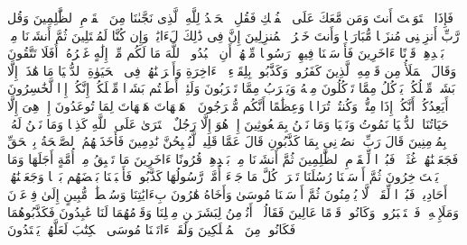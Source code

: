\startbuffer[\q:23:28]
فَإِذَا ٱسۡتَوَیۡتَ أَنتَ وَمَن مَّعَكَ عَلَى ٱلۡفُلۡكِ فَقُلِ ٱلۡحَمۡدُ لِلَّهِ ٱلَّذِی نَجَّىٰنَا مِنَ ٱلۡقَوۡمِ ٱلظَّٰلِمِینَ%
\stopbuffer%
\startbuffer[\q:23:29]
وَقُل رَّبِّ أَنزِلۡنِی مُنزَلࣰا مُّبَارَكࣰا وَأَنتَ خَیۡرُ ٱلۡمُنزِلِینَ%
\stopbuffer%
\startbuffer[\q:23:30]
إِنَّ فِی ذَٰلِكَ لَءَایَٰتࣲ وَإِن كُنَّا لَمُبۡتَلِینَ%
\stopbuffer%
\startbuffer[\q:23:31]
ثُمَّ أَنشَأۡنَا مِنۢ بَعۡدِهِمۡ قَرۡنًا ءَاخَرِینَ%
\stopbuffer%
\startbuffer[\q:23:32]
فَأَرۡسَلۡنَا فِیهِمۡ رَسُولࣰا مِّنۡهُمۡ أَنِ ٱعۡبُدُوا۟ ٱللَّهَ مَا لَكُم مِّنۡ إِلَٰهٍ غَیۡرُهُۥۤۚ أَفَلَا تَتَّقُونَ%
\stopbuffer%
\startbuffer[\q:23:33]
وَقَالَ ٱلۡمَلَأُ مِن قَوۡمِهِ ٱلَّذِینَ كَفَرُوا۟ وَكَذَّبُوا۟ بِلِقَاۤءِ ٱلۡءَاخِرَةِ وَأَتۡرَفۡنَٰهُمۡ فِی ٱلۡحَیَوٰةِ ٱلدُّنۡیَا مَا هَٰذَاۤ إِلَّا بَشَرࣱ مِّثۡلُكُمۡ یَأۡكُلُ مِمَّا تَأۡكُلُونَ مِنۡهُ وَیَشۡرَبُ مِمَّا تَشۡرَبُونَ%
\stopbuffer%
\startbuffer[\q:23:34]
وَلَئِنۡ أَطَعۡتُم بَشَرࣰا مِّثۡلَكُمۡ إِنَّكُمۡ إِذࣰا لَّخَٰسِرُونَ%
\stopbuffer%
\startbuffer[\q:23:35]
أَیَعِدُكُمۡ أَنَّكُمۡ إِذَا مِتُّمۡ وَكُنتُمۡ تُرَابࣰا وَعِظَٰمًا أَنَّكُم مُّخۡرَجُونَ%
\stopbuffer%
\startbuffer[\q:23:36]
۞ هَیۡهَاتَ هَیۡهَاتَ لِمَا تُوعَدُونَ%
\stopbuffer%
\startbuffer[\q:23:37]
إِنۡ هِیَ إِلَّا حَیَاتُنَا ٱلدُّنۡیَا نَمُوتُ وَنَحۡیَا وَمَا نَحۡنُ بِمَبۡعُوثِینَ%
\stopbuffer%
\startbuffer[\q:23:38]
إِنۡ هُوَ إِلَّا رَجُلٌ ٱفۡتَرَىٰ عَلَى ٱللَّهِ كَذِبࣰا وَمَا نَحۡنُ لَهُۥ بِمُؤۡمِنِینَ%
\stopbuffer%
\startbuffer[\q:23:39]
قَالَ رَبِّ ٱنصُرۡنِی بِمَا كَذَّبُونِ%
\stopbuffer%
\startbuffer[\q:23:40]
قَالَ عَمَّا قَلِیلࣲ لَّیُصۡبِحُنَّ نَٰدِمِینَ%
\stopbuffer%
\startbuffer[\q:23:41]
فَأَخَذَتۡهُمُ ٱلصَّیۡحَةُ بِٱلۡحَقِّ فَجَعَلۡنَٰهُمۡ غُثَاۤءࣰۚ فَبُعۡدࣰا لِّلۡقَوۡمِ ٱلظَّٰلِمِینَ%
\stopbuffer%
\startbuffer[\q:23:42]
ثُمَّ أَنشَأۡنَا مِنۢ بَعۡدِهِمۡ قُرُونًا ءَاخَرِینَ%
\stopbuffer%
\startbuffer[\q:23:43]
مَا تَسۡبِقُ مِنۡ أُمَّةٍ أَجَلَهَا وَمَا یَسۡتَءۡخِرُونَ%
\stopbuffer%
\startbuffer[\q:23:44]
ثُمَّ أَرۡسَلۡنَا رُسُلَنَا تَتۡرَاۖ كُلَّ مَا جَاۤءَ أُمَّةࣰ رَّسُولُهَا كَذَّبُوهُۖ فَأَتۡبَعۡنَا بَعۡضَهُم بَعۡضࣰا وَجَعَلۡنَٰهُمۡ أَحَادِیثَۚ فَبُعۡدࣰا لِّقَوۡمࣲ لَّا یُؤۡمِنُونَ%
\stopbuffer%
\startbuffer[\q:23:45]
ثُمَّ أَرۡسَلۡنَا مُوسَىٰ وَأَخَاهُ هَٰرُونَ بِءَایَٰتِنَا وَسُلۡطَٰنࣲ مُّبِینٍ%
\stopbuffer%
\startbuffer[\q:23:46]
إِلَىٰ فِرۡعَوۡنَ وَمَلَإِی۟هِۦ فَٱسۡتَكۡبَرُوا۟ وَكَانُوا۟ قَوۡمًا عَالِینَ%
\stopbuffer%
\startbuffer[\q:23:47]
فَقَالُوۤا۟ أَنُؤۡمِنُ لِبَشَرَیۡنِ مِثۡلِنَا وَقَوۡمُهُمَا لَنَا عَٰبِدُونَ%
\stopbuffer%
\startbuffer[\q:23:48]
فَكَذَّبُوهُمَا فَكَانُوا۟ مِنَ ٱلۡمُهۡلَكِینَ%
\stopbuffer%
\startbuffer[\q:23:49]
وَلَقَدۡ ءَاتَیۡنَا مُوسَى ٱلۡكِتَٰبَ لَعَلَّهُمۡ یَهۡتَدُونَ%
